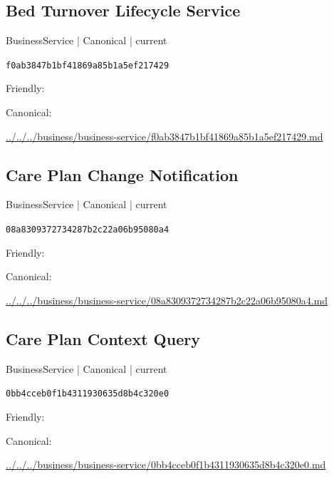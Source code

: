 \documentclass[10pt,a4paper]{article}
\begin{document}
\subsection*{Bed Turnover Lifecycle Service}
{\small BusinessService | Canonical | current}\par
\texttt{f0ab3847b1bf41869a85b1a5ef217429}\par
Friendly: \par
Canonical: \par
{\footnotesize\url{../../../business/business-service/f0ab3847b1bf41869a85b1a5ef217429.md}}\par
\subsection*{Care Plan Change Notification}
{\small BusinessService | Canonical | current}\par
\texttt{08a8309372734287b2c22a06b95080a4}\par
Friendly: \par
Canonical: \par
{\footnotesize\url{../../../business/business-service/08a8309372734287b2c22a06b95080a4.md}}\par
\subsection*{Care Plan Context Query}
{\small BusinessService | Canonical | current}\par
\texttt{0bb4cceb0f1b4311930635d8b4c320e0}\par
Friendly: \par
Canonical: \par
{\footnotesize\url{../../../business/business-service/0bb4cceb0f1b4311930635d8b4c320e0.md}}\par
\end{document}
